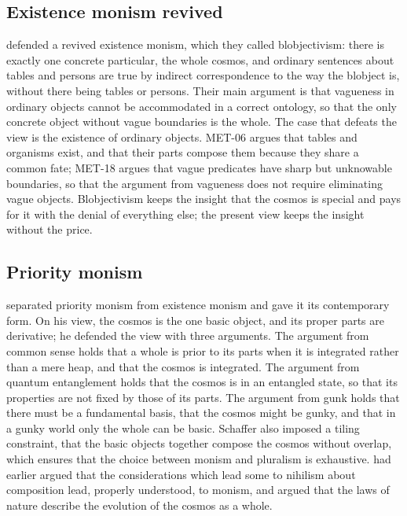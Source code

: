 \documentclass{situationist-preprint}
\begin{document}
\subsection{Existence monism revived}

\citet{HorganPotrc2008} defended a revived existence monism, which they called blobjectivism: there is exactly one concrete particular, the whole cosmos, and ordinary sentences about tables and persons are true by indirect correspondence to the way the blobject is, without there being tables or persons. Their main argument is that vagueness in ordinary objects cannot be accommodated in a correct ontology, so that the only concrete object without vague boundaries is the whole. The case that defeats the view is the existence of ordinary objects. MET-06 argues that tables and organisms exist, and that their parts compose them because they share a common fate; MET-18 argues that vague predicates have sharp but unknowable boundaries, so that the argument from vagueness does not require eliminating vague objects. Blobjectivism keeps the insight that the cosmos is special and pays for it with the denial of everything else; the present view keeps the insight without the price.

\subsection{Priority monism}

\citet{Schaffer2010} separated priority monism from existence monism and gave it its contemporary form. On his view, the cosmos is the one basic object, and its proper parts are derivative; he defended the view with three arguments. The argument from common sense holds that a whole is prior to its parts when it is integrated rather than a mere heap, and that the cosmos is integrated. The argument from quantum entanglement holds that the cosmos is in an entangled state, so that its properties are not fixed by those of its parts. The argument from gunk holds that there must be a fundamental basis, that the cosmos might be gunky, and that in a gunky world only the whole can be basic. Schaffer also imposed a tiling constraint, that the basic objects together compose the cosmos without overlap, which ensures that the choice between monism and pluralism is exhaustive. \citet{Schaffer2007} had earlier argued that the considerations which lead some to nihilism about composition lead, properly understood, to monism, and \citet{Schaffer2013} argued that the laws of nature describe the evolution of the cosmos as a whole.
\end{document}
